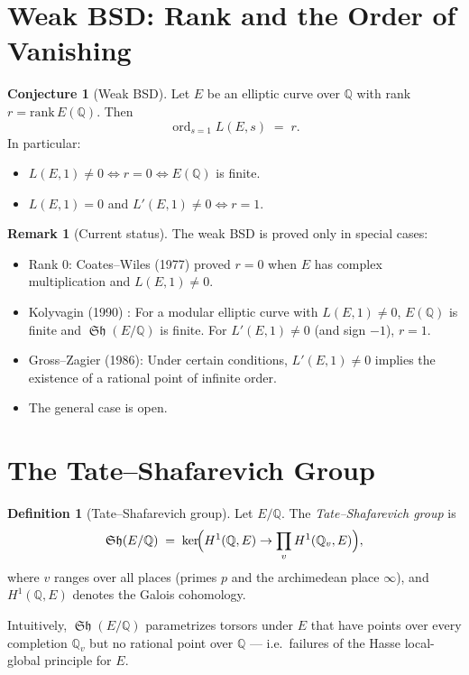 \documentclass[12pt,a4paper]{amsart}
\theoremstyle{definition}
\newtheorem{definition}[theorem]{Definition}
\newtheorem{remark}[theorem]{Remark}
\newtheorem{conjecture}[theorem]{Conjecture}
\newcommand{\Q}{\mathbb{Q}}
\DeclareMathOperator{\ord}{ord}
\DeclareMathOperator{\Sha}{\mathfrak{Sh}}
\begin{document}
\section{Weak BSD: Rank and the Order of Vanishing}

\begin{conjecture}[Weak BSD]
\label{conj:weak_bsd}
Let $E$ be an elliptic curve over $\Q$ with rank $r = \mathrm{rank}\, E(\Q)$.
Then
\[
  \ord_{s=1} L(E,s) \;=\; r.
\]
In particular:
\begin{itemize}
  \item $L(E,1) \ne 0 \iff r = 0 \iff E(\Q)$ is finite.
  \item $L(E,1) = 0$ and $L'(E,1) \ne 0 \iff r = 1$.
\end{itemize}
\end{conjecture}

\begin{remark}[Current status]
The weak BSD is proved only in special cases:
\begin{itemize}
  \item Rank $0$: Coates--Wiles (1977) \cite{CoatesWiles1977} proved $r=0$
    when $E$ has complex multiplication and $L(E,1) \ne 0$.
  \item Kolyvagin (1990) \cite{Kolyvagin1990}: For a modular elliptic curve
    with $L(E,1) \ne 0$, $E(\Q)$ is finite and $\Sha(E/\Q)$ is finite.
    For $L'(E,1) \ne 0$ (and sign $-1$), $r = 1$.
  \item Gross--Zagier (1986): Under certain conditions, $L'(E,1) \ne 0$
    implies the existence of a rational point of infinite order.
  \item The general case is open.
\end{itemize}
\end{remark}

\section{The Tate--Shafarevich Group}

\begin{definition}[Tate--Shafarevich group]
\label{def:sha}
Let $E/\Q$.  The \emph{Tate--Shafarevich group} is
\[
  \Sha(E/\Q) \;=\; \ker\!\Bigl(H^1(\Q, E) \to \prod_v H^1(\Q_v, E)\Bigr),
\]
where $v$ ranges over all places (primes $p$ and the archimedean place $\infty$),
and $H^1(\Q, E)$ denotes the Galois cohomology.

Intuitively, $\Sha(E/\Q)$ parametrizes torsors under $E$ that have
points over every completion $\Q_v$ but no rational point over $\Q$
--- i.e.\ failures of the Hasse local-global principle for $E$.
\end{definition}
\end{document}
